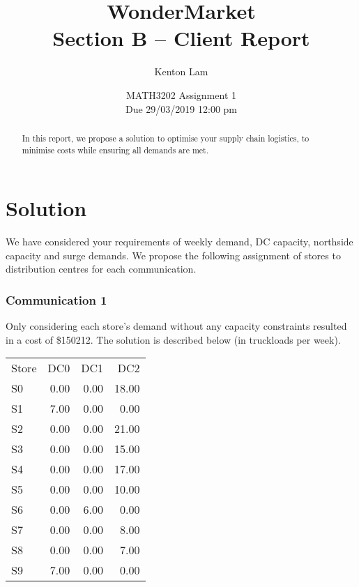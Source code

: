 \documentclass[11pt,a4paper]{article}
\author{Kenton Lam}
\date{{MATH3202 Assignment 1 \\ Due 29/03/2019 12:00 pm}}
\title{WonderMarket \\ 
Section B -- Client Report}
\begin{document}
\maketitle
\begin{abstract}
    In this report, we propose a solution to optimise your supply chain logistics, 
    to minimise costs while ensuring all demands are met.
\end{abstract}

\part{Solution}
We have considered your requirements of weekly demand, DC capacity, northside capacity and surge demands.
We propose the following assignment of stores to distribution centres for each communication.

\section{Communication 1}
Only considering each store's demand without any capacity constraints 
resulted in a cost of \$150212. The solution is described below (in truckloads per week). \\[0.8em]
\begin{tabular}{l  r  r  r }
    Store & DC0 & DC1 & DC2 \\
    S0 & 0.00 & 0.00 & 18.00 \\
    S1 & 7.00 & 0.00 & 0.00 \\
    S2 & 0.00 & 0.00 & 21.00 \\
    S3 & 0.00 & 0.00 & 15.00 \\
    S4 & 0.00 & 0.00 & 17.00 \\
    S5 & 0.00 & 0.00 & 10.00 \\
    S6 & 0.00 & 6.00 & 0.00 \\
    S7 & 0.00 & 0.00 & 8.00 \\
    S8 & 0.00 & 0.00 & 7.00 \\
    S9 & 7.00 & 0.00 & 0.00 \\    
\end{tabular}
\end{document}
